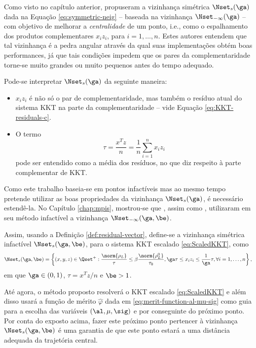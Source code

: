 Como visto no capítulo anterior, \citet{Colombo:2008ia}  propuseram  a
vizinhança simétrica $\Nset_s(\ga)$ dada na Equação \eqref{eq:symmetric-neig} --
baseada na vizinhança $\Nset_{-\infty}(\ga)$ --  com objetivo de melhorar a
\emph{centralidade} de um ponto, i.e., como o espalhamento dos produtos
complementares $x_iz_i$, para $i=1,\ldots,n$. Estes autores entendem que tal
vizinhança é a pedra angular através da qual suas implementações obtém boas
performances, já que tais condições impedem que os pares da complementaridade
torne-se muito grandes ou muito pequenos antes do tempo adequado.

Pode-se interpretar $\Nset_s(\ga)$ da seguinte maneira:
\begin{itemize}
  \item $x_iz_i$  é não só o par de complementaridade, mas também o resíduo
  atual do sistema KKT na parte da complementaridade -- vide  Equação
  \eqref{eq:KKT-residuals-c}.
  \item O termo  \[\tau = \frac{x^Tz}{n} = \frac{1}{n}\sum_{i=1}^nx_iz_i\]
  pode ser entendido como a média dos resíduos, no que diz respeito à parte
  complementar de KKT.
\end{itemize}

Como este trabalho  baseia-se em pontos infactíveis mas ao mesmo tempo
pretende utilizar as boas propriedades da vizinhança  $\Nset_s(\ga)$,
é necessário estendê-la. No Capítulo \ref{chap:mpis},
mostrou-se que \citet{Kojima:1993fe}, assim como 
\citet[pg.~110]{Wright:Primal-dual-interior-point:1997h}, utilizaram em seu
método infactível a vizinhança $\Nset_{-\infty}(\ga,\be)$.


Assim, usando a Definição \ref{def:residual-vector}, define-se  a vizinhança
simétrica infactível $\Nset_s(\ga,\be)$, para o sistema KKT escalado
\eqref{eq:ScaledKKT}, como 
\begin{equation}
\label{eq:infeasible-symmetric-neig}
 \Nset_{s}(\ga,\be) =
 \left\{(x,y,z) \in \Qset^+:\frac{\norm{\rho_L}}{\tau} \leq
\beta\frac{\norm{\rho^0_L}}{\tau_0}, \ga\tau\leq x_iz_i \leq
\frac{1}{\ga}\tau,\forall i =1,\ldots,n  \right\},
\end{equation}
em que $\ga\in(0,1)$, $\tau=x^Tz/n$ e $\be>1$.


Até agora, o método proposto resolverá o \ac{KKT} escalado \eqref{eq:ScaledKKT}
e além disso usará a função de mérito $\hat{\varphi}$ dada em
\eqref{eq:merit-function-al-mu-sig} como guia para a escolha das variáveis
$(\al,\mu,\sig)$  e por conseguinte do próximo ponto. Por conta do exposto
acima, fazer este próximo ponto pertencer à vizinhança $\Nset_{s}(\ga,\be)$ é
uma garantia de que este ponto estará a uma  distância adequada da
trajetória central.

